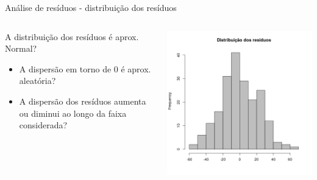 \documentclass{beamer}
\begin{document}
\begin{frame}{\scriptsize Análise de resíduos - distribuição dos resíduos}
  \begin{columns}
    \begin{column}{5cm}
      A distribuição dos resíduos é aprox. Normal?
      \bigskip
      \begin{itemize}
        \footnotesize
      \item A dispersão em torno de 0 é aprox. aleatória?
        \bigskip
      \item A dispersão dos resíduos aumenta ou diminui ao longo da faixa considerada?
      \end{itemize}
    \end{column}
    \begin{column}{5cm}
      \begin{center}
        \includegraphics[width=1.1\textwidth]{Cap18-19/pratica-rls-resid-hist}
      \end{center}
    \end{column}
  \end{columns}
\end{frame}
\end{document}
